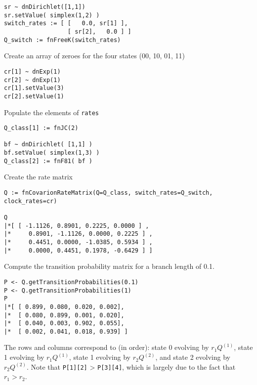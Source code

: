 {\tt \begin{snugshade*}
\begin{lstlisting}
sr ~ dnDirichlet([1,1])
sr.setValue( simplex(1,2) )
switch_rates := [ [   0.0, sr[1] ],
                  [ sr[2],   0.0 ] ]
Q_switch := fnFreeK(switch_rates)
\end{lstlisting}
\end{snugshade*}}

Create an array of zeroes for the four states (00, 10, 01, 11)

{\tt \begin{snugshade*}
\begin{lstlisting}
cr[1] ~ dnExp(1)
cr[2] ~ dnExp(1)
cr[1].setValue(3)
cr[2].setValue(1)
\end{lstlisting}
\end{snugshade*}}

Populate the elements of {\tt rates}

{\tt \begin{snugshade*}
\begin{lstlisting}
Q_class[1] := fnJC(2)

bf ~ dnDirichlet( [1,1] )
bf.setValue( simplex(1,3) )
Q_class[2] := fnF81( bf )

\end{lstlisting}
\end{snugshade*}}

Create the rate matrix

{\tt \begin{snugshade*}
\begin{lstlisting}
Q := fnCovarionRateMatrix(Q=Q_class, switch_rates=Q_switch, clock_rates=cr)

Q
|*[ [ -1.1126, 0.8901, 0.2225, 0.0000 ] ,
|*     0.8901, -1.1126, 0.0000, 0.2225 ] ,
|*     0.4451, 0.0000, -1.0385, 0.5934 ] ,
|*     0.0000, 0.4451, 0.1978, -0.6429 ] ]
\end{lstlisting}
\end{snugshade*}}

Compute the transition probability matrix for a branch length of 0.1.

{\tt \begin{snugshade*}
\begin{lstlisting}
P <- Q.getTransitionProbabilities(0.1)
P <- Q.getTransitionProbabilities(1)
P
|*[ [ 0.899, 0.080, 0.020, 0.002],
|*  [ 0.080, 0.899, 0.001, 0.020],
|*  [ 0.040, 0.003, 0.902, 0.055],
|*  [ 0.002, 0.041, 0.018, 0.939] ]
\end{lstlisting}
\end{snugshade*}}

The rows and columns correspond to (in order): state 0 evolving by $r_1 Q^{(1)}$, state 1 evolving by $r_1 Q^{(1)}$, state 1 evolving by $r_2 Q^{(2)}$, and state 2 evolving by $r_2 Q^{(2)}$.
Note that {\tt P[1][2]} > {\tt P[3][4]}, which is largely due to the fact that $r_1 > r_2$.

\newpage
